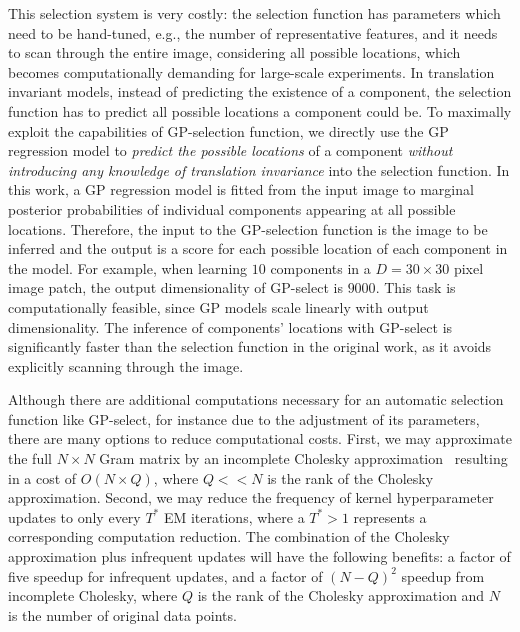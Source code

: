 This selection system is very costly: the selection function has parameters which need to be hand-tuned, e.g., the number of representative features, and %
it needs to scan through the entire image, considering all possible locations, which becomes computationally demanding for large-scale experiments.
%
In translation invariant models, instead of predicting the existence of a component, the selection function has to predict all possible locations a component could be.
To maximally exploit the capabilities of GP-selection function, we directly use the GP regression model to \textit{predict the possible locations} of a component \textit{without introducing any knowledge of translation invariance} into the selection function. In this work, a GP regression model is fitted from the input image to marginal posterior probabilities of individual components appearing at all possible locations. Therefore, the input to the GP-selection function is the image to be inferred and the output is a score for each possible location of each component in the model.
For example, when learning $10$ components in a $D=30\times 30$ pixel image patch, the output dimensionality of GP-select is $9000$.
This task is computationally feasible, since GP models scale linearly with output dimensionality.
The inference of components' locations with GP-select is significantly faster than the selection function in the original work, as it avoids explicitly scanning through the image.

Although there are additional computations necessary for an automatic selection function like GP-select, for instance due to the adjustment of its parameters,  %
there are many options to reduce computational costs. %
First, we may approximate the full $N \times N$ Gram matrix by an incomplete Cholesky approximation~\citep{FinSch01} 
resulting in a cost of $O(N\times Q)$, where $Q << N$ is the rank of the Cholesky approximation.
%
Second, we may reduce the frequency of kernel hyperparameter updates to only every $T^*$ EM iterations, where a $T^* > 1$ represents a corresponding computation reduction.
The combination of the Cholesky approximation plus infrequent updates will have the following benefits: a factor of five speedup for infrequent updates, and a factor of $(N-Q)^2$ speedup from incomplete Cholesky, where $Q$ is the rank of the Cholesky approximation and $N$ is the number of original data points. 


